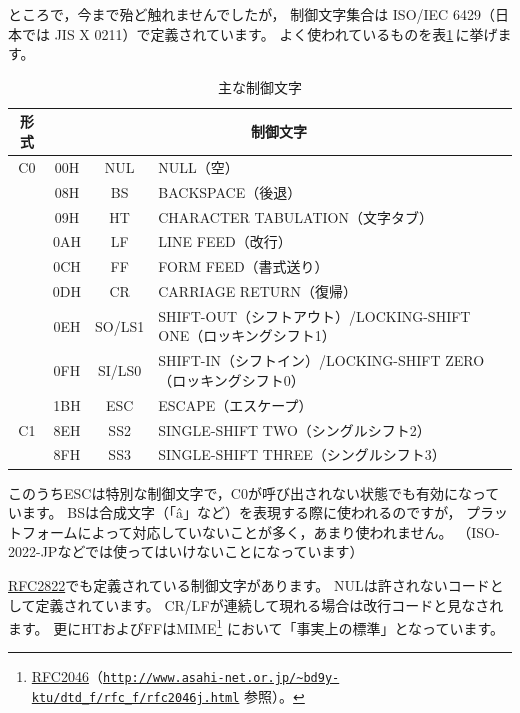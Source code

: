 \documentclass[a4j,10pt,fleqn,uplatex]{jsarticle}
\begin{document}
ところで，今まで殆ど触れませんでしたが，
制御文字集合は ISO/IEC 6429（日本では JIS X 0211）で定義されています。
よく使われているものを表\ref{tbl:control-codes}\,に挙げます。
\begin{table}[htp]
\begin{center}\begin{tabular}{|c|c|c|l|}
    \hline
    形式 & \multicolumn{3}{c|}{制御文字} \\ \hline
    \hline
    C0   & 00H & NUL    & NULL（空） \\ \cline{2-4}
         & 08H & BS     & BACKSPACE（後退） \\ \cline{2-4}
         & 09H & HT     & CHARACTER TABULATION（文字タブ） \\ \cline{2-4}
         & 0AH & LF     & LINE FEED（改行） \\ \cline{2-4}
         & 0CH & FF     & FORM FEED（書式送り） \\ \cline{2-4}
         & 0DH & CR     & CARRIAGE RETURN（復帰） \\ \cline{2-4}
         & 0EH & SO/LS1 & SHIFT-OUT（シフトアウト）/LOCKING-SHIFT ONE（ロッキングシフト1） \\ \cline{2-4}
         & 0FH & SI/LS0 & SHIFT-IN（シフトイン）/LOCKING-SHIFT ZERO（ロッキングシフト0） \\ \cline{2-4}
         & 1BH & ESC    & ESCAPE（エスケープ） \\
    \hline
    C1   & 8EH & SS2    & SINGLE-SHIFT TWO（シングルシフト2） \\ \cline{2-4}
         & 8FH & SS3    & SINGLE-SHIFT THREE（シングルシフト3） \\
    \hline
\end{tabular}\end{center}
\caption{主な制御文字}\label{tbl:control-codes}
\end{table}%

このうちESCは特別な制御文字で，C0が呼び出されない状態でも有効になっています。
BSは合成文字（「\^a」など）を表現する際に使われるのですが，
プラットフォームによって対応していないことが多く，あまり使われません。
（ISO-2022-JPなどでは使ってはいけないことになっています）

\href{ftp://ftp.isi.edu/in-notes/rfc2822.txt}{RFC2822}でも定義されている制御文字があります。
NULは許されないコードとして定義されています。
CR/LFが連続して現れる場合は改行コードと見なされます。
更にHTおよびFFはMIME\footnote{
    \href{ftp://ftp.isi.edu/in-notes/rfc2046.txt}{RFC2046}（\href{http://www.asahi-net.or.jp/~bd9y-ktu/dtd_f/rfc_f/rfc2046j.html}{\texttt{http://www.asahi-net.or.jp/\~{}bd9y-ktu/dtd\_f/rfc\_f/rfc2046j.html}} 参照）。
} において「事実上の標準」となっています。
\end{document}
